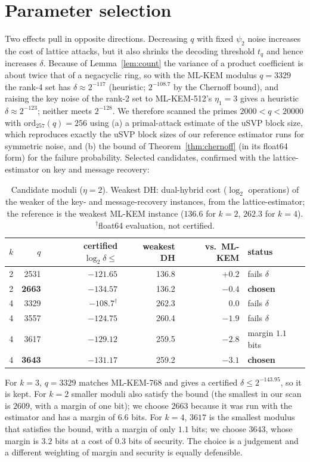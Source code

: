 \documentclass[11pt]{article}
\theoremstyle{remark}
\begin{document}
\section{Parameter selection}\label{sec:params}
Two effects pull in opposite directions. Decreasing $q$ with fixed $\psi_2$ noise increases the cost of lattice attacks, but it also shrinks the decoding threshold $t_q$ and hence increases $\delta$. Because of Lemma~\ref{lem:count} the variance of a product coefficient is about twice that of a negacyclic ring, so with the ML-KEM modulus $q=3329$ the rank-4 set has $\delta\approx2^{-117}$ (heuristic; $2^{-108.7}$ by the Chernoff bound), and raising the key noise of the rank-2 set to ML-KEM-512's $\eta_1=3$ gives a heuristic $\delta\approx2^{-123}$; neither meets $2^{-128}$. We therefore scanned the primes $2000<q<20000$ with $\mathrm{ord}_{257}(q)=256$ using (a) a primal-attack estimate of the uSVP block size, which reproduces exactly the uSVP block sizes of our reference estimator runs for symmetric noise, and (b) the bound of Theorem~\ref{thm:chernoff} (in its float64 form) for the failure probability. Selected candidates, confirmed with the lattice-estimator on key and message recovery:
\begin{table}[h]\centering\small
\begin{tabular}{rrrrrl}\toprule
$k$ & $q$ & certified $\log_2\delta\le$ & weakest DH & vs.\ ML-KEM & status\\\midrule
2 & 2531 & $-121.65$ & 136.8 & $+0.2$ & fails $\delta$\\
2 & \textbf{2663} & $-134.57$ & 136.2 & $-0.4$ & \textbf{chosen}\\
4 & 3329 & $-108.7^{\dagger}$ & 262.3 & $0.0$ & fails $\delta$\\
4 & 3557 & $-124.75$ & 260.4 & $-1.9$ & fails $\delta$\\
4 & 3617 & $-129.12$ & 259.5 & $-2.8$ & margin $1.1$ bits\\
4 & \textbf{3643} & $-131.17$ & 259.2 & $-3.1$ & \textbf{chosen}\\\bottomrule
\end{tabular}
\caption{Candidate moduli ($\eta=2$). Weakest DH: dual-hybrid cost ($\log_2$ operations) of the weaker of the key- and message-recovery instances, from the lattice-estimator; the reference is the weakest ML-KEM instance ($136.6$ for $k=2$, $262.3$ for $k=4$). $^{\dagger}$float64 evaluation, not certified.}\label{tab:cands}
\end{table}
For $k=3$, $q=3329$ matches ML-KEM-768 and gives a certified $\delta\le2^{-143.95}$, so it is kept. For $k=2$ smaller moduli also satisfy the bound (the smallest in our scan is $2609$, with a margin of one bit); we choose $2663$ because it was run with the estimator and has a margin of $6.6$ bits. For $k=4$, $3617$ is the smallest modulus that satisfies the bound, with a margin of only $1.1$ bits; we choose $3643$, whose margin is $3.2$ bits at a cost of $0.3$ bits of security. The choice is a judgement and a different weighting of margin and security is equally defensible.
\end{document}
